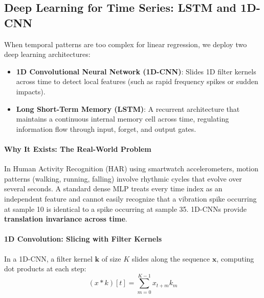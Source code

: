 \subsection{Deep Learning for Time Series: LSTM and 1D-CNN}

\begin{keyidea}
When temporal patterns are too complex for linear regression, we deploy two deep learning architectures:
\begin{itemize}
    \item \textbf{1D Convolutional Neural Network (1D-CNN)}: Slides 1D filter kernels across time to detect local features (such as rapid frequency spikes or sudden impacts).
    \item \textbf{Long Short-Term Memory (LSTM)}: A recurrent architecture that maintains a continuous internal memory cell across time, regulating information flow through input, forget, and output gates.
\end{itemize}
\end{keyidea}

\paragraph{Why It Exists: The Real-World Problem}
In Human Activity Recognition (HAR) using smartwatch accelerometers, motion patterns (walking, running, falling) involve rhythmic cycles that evolve over several seconds. A standard dense MLP treats every time index as an independent feature and cannot easily recognize that a vibration spike occurring at sample 10 is identical to a spike occurring at sample 35. 1D-CNNs provide \textbf{translation invariance across time}.

\paragraph{1D Convolution: Slicing with Filter Kernels}
In a 1D-CNN, a filter kernel $\mathbf{k}$ of size $K$ slides along the sequence $\mathbf{x}$, computing dot products at each step:
\begin{equation}
(x * k)[t] = \sum_{m=0}^{K-1} x_{t+m} k_m\label{eq:conv1d}
\end{equation}

